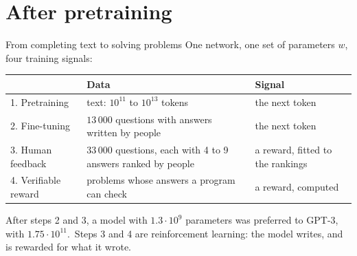 \documentclass[10pt]{beamer}
\newcommand{\ctrl}[1]{\textcolor{ctrl}{#1}}
\begin{document}
\section{After pretraining}

\begin{frame}{From completing text to solving problems}
\small
One network, one set of parameters $w$, four training signals:

\medskip
\footnotesize
\renewcommand{\arraystretch}{1.35}
\begin{tabularx}{\textwidth}{@{}l >{\raggedright\arraybackslash}X >{\raggedright\arraybackslash}p{}@{}}
\toprule
 & \textbf{Data} & \textbf{Signal} \\
\midrule
\alert{1. Pretraining} & text: $10^{11}$ to $10^{13}$ tokens \citep{brown2020,deepseek2026} & the next token \\
\alert{2. Fine-tuning} & $13\,000$ questions with answers written by people & the next token \\
\alert{3. Human feedback} & $33\,000$ questions, each with 4 to 9 answers ranked by people & a reward, fitted to the rankings \\
\ctrl{4. Verifiable reward} & problems whose answers a program can check & \ctrl{a reward, computed} \\
\bottomrule
\end{tabularx}

\medskip
\small
After steps 2 and 3, a model with $1.3\cdot10^9$ parameters was preferred to GPT-3, with $1.75\cdot10^{11}$.\footnotemark\ Steps 3 and 4 are \alert{reinforcement learning}: the model writes, and is rewarded for what it wrote.
\end{frame}
\end{document}
